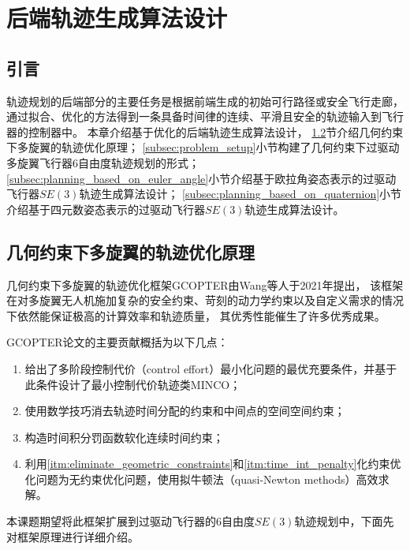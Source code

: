 
\chapter{后端轨迹生成算法设计}\label{chap:back_end_trajectory_generation}

\section{引言}\label{sec:intro_4}
轨迹规划的后端部分的主要任务是根据前端生成的初始可行路径或安全飞行走廊，
通过拟合、优化的方法得到一条具备时间律的连续、平滑且安全的轨迹输入到飞行器的控制器中。
本章介绍基于优化的后端轨迹生成算法设计，
\ref{sec:geometrically_constrained_trajectory_optimization}节介绍几何约束下多旋翼的轨迹优化原理；
\ref{subsec:problem_setup}小节构建了几何约束下过驱动多旋翼飞行器6自由度轨迹规划的形式；
\ref{subsec:planning_based_on_euler_angle}小节介绍基于欧拉角姿态表示的过驱动飞行器$SE(3)$轨迹生成算法设计；
\ref{subsec:planning_based_on_quaternion}小节介绍基于四元数姿态表示的过驱动飞行器$SE(3)$轨迹生成算法设计。

\section{几何约束下多旋翼的轨迹优化原理}\label{sec:geometrically_constrained_trajectory_optimization}
几何约束下多旋翼的轨迹优化框架GCOPTER\cite{2021Geometrically}由Wang等人于2021年提出，
该框架在对多旋翼无人机施加复杂的安全约束、苛刻的动力学约束以及自定义需求的情况下依然能保证极高的计算效率和轨迹质量，
其优秀性能催生了许多优秀成果\cite{2021Fast, zhou2022swarm}。

GCOPTER论文的主要贡献概括为以下几点：
\begin{enumerate}
  \renewcommand{\labelenumi}{(\theenumi)}
  \item 给出了多阶段控制代价（control effort）最小化问题的最优充要条件，并基于此条件设计了最小控制代价轨迹类MINCO；
  \item 使用数学技巧消去轨迹时间分配的约束和中间点的空间空间约束；\label{itm:eliminate_geometric_constraints}
  \item 构造时间积分罚函数软化连续时间约束；\label{itm:time_int_penalty}
  \item 利用\ref{itm:eliminate_geometric_constraints}和\ref{itm:time_int_penalty}化约束优化问题为无约束优化问题，使用拟牛顿法（quasi-Newton methods）高效求解。
\end{enumerate}
本课题期望将此框架扩展到过驱动飞行器的6自由度$SE(3)$轨迹规划中，下面先对框架原理进行详细介绍。

